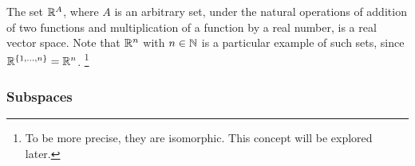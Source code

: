 \begin{example}
	The set $\mathbb{R}^A$, where $A$ is an arbitrary set, under the natural operations of addition of two functions and multiplication of a function by a real number, is a real vector space. Note that $\mathbb{R}^n$ with $n \in \mathbb{N}$ is a particular example of such sets, since $\mathbb{R}^{ \{ 1, \ldots, n \} } = \mathbb{R}^n$. \footnote{To be more precise, they are isomorphic. This concept will be explored later.}	
\end{example}
\subsubsection{Subspaces}
